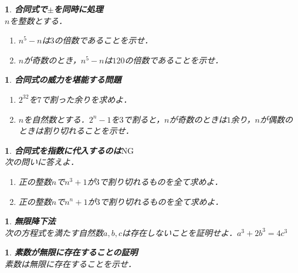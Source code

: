 \documentclass[10pt,
fleqn,
dvipdfmx,
uplatex
]{jsarticle}
\newtheorem{question}[Question]{}
\begin{document}
\begin{question}{\bf\boldmath 合同式で$±$を同時に処理}\\
$n$を整数とする．
\begin{enumerate}
\item $n^5-n$は$3$の倍数であることを示せ．
\item $n$が奇数のとき，$n^5-n$は${120}$の倍数であることを示せ．
\end{enumerate}

\end{question}



\begin{question}{\bf\boldmath 合同式の威力を堪能する問題}\\

\begin{enumerate}
\item $2^{32}$を$7$で割った余りを求めよ．
\item $n$を自然数とする．$2^n-1$を$3$で割ると，$n$が奇数のときは$1$余り，$n$が偶数のときは割り切れることを示せ．
\end{enumerate}

\end{question}



\begin{question}{\bf\boldmath 合同式を指数に代入するのは$\text{NG}$}\\
次の問いに答えよ．
\begin{enumerate}
\item 正の整数$n$で$n^3+1$が$3$で割り切れるものを全て求めよ．
\item 正の整数$n$で$n^n+1$が$3$で割り切れるものを全て求めよ．
\end{enumerate}

\end{question}



\begin{question}{\bf\boldmath 無限降下法}\\
次の方程式を満たす自然数$a, b, c$は存在しないことを証明せよ．$a^3+2b^3=4c^3$
\end{question}



\begin{question}{\bf\boldmath 素数が無限に存在することの証明}\\
素数は無限に存在することを示せ．
\end{question}
\end{document}
